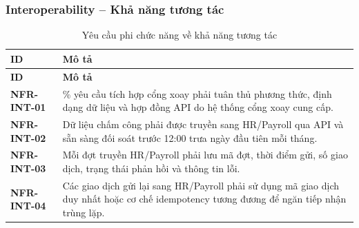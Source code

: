 \subsubsection{Interoperability -- Khả năng tương tác}
\begingroup
\small
\renewcommand{\arraystretch}{1.2}
\begin{longtable}{|>{\centering\arraybackslash}m{3cm}|>{\raggedright\arraybackslash}m{12.9cm}|}
    \caption{Yêu cầu phi chức năng về khả năng tương tác}\label{tab:nfr-interoperability}\\
    \hline
    \textbf{ID} & \textbf{Mô tả}\\
    \hline
    \endfirsthead
    \hline
    \textbf{ID} & \textbf{Mô tả}\\
    \hline
    \endhead
    \hline
    \endfoot
    \hline
    \endlastfoot
    \textbf{NFR-INT-01} & 100\% yêu cầu tích hợp cổng xoay phải tuân thủ phương thức, định dạng dữ liệu và hợp đồng API do hệ thống cổng xoay cung cấp.\\
    \hline
    \textbf{NFR-INT-02} & Dữ liệu chấm công phải được truyền sang HR/Payroll qua API và sẵn sàng đối soát trước 12:00 trưa ngày đầu tiên mỗi tháng.\\
    \hline
    \textbf{NFR-INT-03} & Mỗi đợt truyền HR/Payroll phải lưu mã đợt, thời điểm gửi, số giao dịch, trạng thái phản hồi và thông tin lỗi.\\
    \hline
    \textbf{NFR-INT-04} & Các giao dịch gửi lại sang HR/Payroll phải sử dụng mã giao dịch duy nhất hoặc cơ chế idempotency tương đương để ngăn tiếp nhận trùng lặp.\\
    \hline
\end{longtable}
\endgroup

